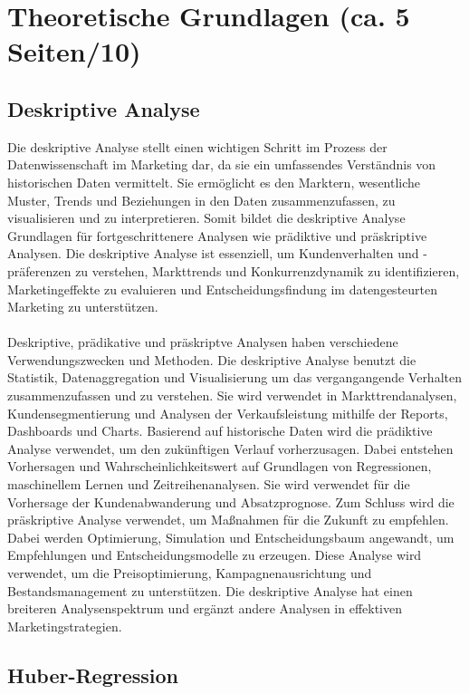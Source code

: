 \newpage
\section{Theoretische Grundlagen (ca. 5 Seiten/10)}
\subsection{Deskriptive Analyse}
Die deskriptive Analyse stellt einen wichtigen Schritt im Prozess der Datenwissenschaft im Marketing dar, da sie ein umfassendes Verständnis von historischen Daten vermittelt. Sie ermöglicht es den Marktern, wesentliche Muster, Trends und Beziehungen in den Daten zusammenzufassen, zu visualisieren und zu interpretieren. Somit bildet die deskriptive Analyse Grundlagen für fortgeschrittenere Analysen wie prädiktive und präskriptive Analysen. Die deskriptive Analyse ist essenziell, um Kundenverhalten und -präferenzen zu verstehen, Markttrends und Konkurrenzdynamik zu identifizieren, Marketingeffekte zu evaluieren und Entscheidungsfindung im datengesteurten Marketing zu unterstützen\cite{brown2024mastering}. \\\\
Deskriptive, prädikative und präskriptve Analysen haben verschiedene Verwendungszwecken und Methoden. Die deskriptive Analyse benutzt die Statistik, Datenaggregation und Visualisierung um das vergangangende Verhalten zusammenzufassen und zu verstehen. Sie wird verwendet in Markttrendanalysen, Kundensegmentierung und Analysen der Verkaufsleistung mithilfe der Reports, Dashboards und Charts. Basierend auf historische Daten wird die prädiktive Analyse verwendet, um den zukünftigen Verlauf vorherzusagen. Dabei entstehen Vorhersagen und Wahrscheinlichkeitswert auf Grundlagen von Regressionen, maschinellem Lernen und Zeitreihenanalysen. Sie wird verwendet für die Vorhersage der Kundenabwanderung und Absatzprognose. Zum Schluss wird die präskriptive Analyse verwendet, um Maßnahmen für die Zukunft zu empfehlen. Dabei werden Optimierung, Simulation und Entscheidungsbaum angewandt, um Empfehlungen und Entscheidungsmodelle zu erzeugen. Diese Analyse wird verwendet, um die Preisoptimierung, Kampagnenausrichtung und Bestandsmanagement zu unterstützen. Die deskriptive Analyse hat einen breiteren Analysenspektrum und ergänzt andere Analysen in effektiven Marketingstrategien\cite{brown2024mastering}. 



\subsection{Huber-Regression}

